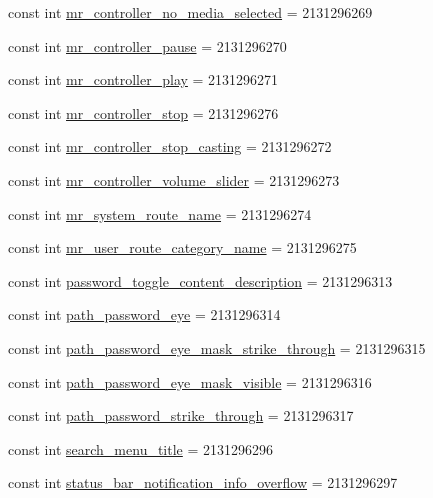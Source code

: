 \begin{CompactItemize}
const int \hyperlink{class__2doo_1_1_droid_1_1_resource_1_1_string_73c363fd9930688bf0b23ae01d21afdc}{mr\_\-controller\_\-no\_\-media\_\-selected} = 2131296269
\item 
const int \hyperlink{class__2doo_1_1_droid_1_1_resource_1_1_string_7c6f4d3d3ba11c49984c58cf8ef5545a}{mr\_\-controller\_\-pause} = 2131296270
\item 
const int \hyperlink{class__2doo_1_1_droid_1_1_resource_1_1_string_46e3efc97eef631ddcf532d02b52ae85}{mr\_\-controller\_\-play} = 2131296271
\item 
const int \hyperlink{class__2doo_1_1_droid_1_1_resource_1_1_string_618027e879ba7b226e9b915df0961188}{mr\_\-controller\_\-stop} = 2131296276
\item 
const int \hyperlink{class__2doo_1_1_droid_1_1_resource_1_1_string_7fd2c48559870d0e0628b8054904ca2c}{mr\_\-controller\_\-stop\_\-casting} = 2131296272
\item 
const int \hyperlink{class__2doo_1_1_droid_1_1_resource_1_1_string_f08fc0ec64fe7cf8e80f3c2154d0a3c5}{mr\_\-controller\_\-volume\_\-slider} = 2131296273
\item 
const int \hyperlink{class__2doo_1_1_droid_1_1_resource_1_1_string_55bed14c193bf99f283608a5c41e6885}{mr\_\-system\_\-route\_\-name} = 2131296274
\item 
const int \hyperlink{class__2doo_1_1_droid_1_1_resource_1_1_string_d1e05d552d36d8e4c5ace1b7d918b59e}{mr\_\-user\_\-route\_\-category\_\-name} = 2131296275
\item 
const int \hyperlink{class__2doo_1_1_droid_1_1_resource_1_1_string_72269cac9c7d83020ec378b61ade8754}{password\_\-toggle\_\-content\_\-description} = 2131296313
\item 
const int \hyperlink{class__2doo_1_1_droid_1_1_resource_1_1_string_431d818b3c3fb914b6c9ec960a616eb8}{path\_\-password\_\-eye} = 2131296314
\item 
const int \hyperlink{class__2doo_1_1_droid_1_1_resource_1_1_string_cb4cb06d1a1d1b6c50bb2373e89bcbec}{path\_\-password\_\-eye\_\-mask\_\-strike\_\-through} = 2131296315
\item 
const int \hyperlink{class__2doo_1_1_droid_1_1_resource_1_1_string_4e2ec147ec271b6de2d14a5617e5ada9}{path\_\-password\_\-eye\_\-mask\_\-visible} = 2131296316
\item 
const int \hyperlink{class__2doo_1_1_droid_1_1_resource_1_1_string_043836fcea7d779ac6fbb6759c946bbe}{path\_\-password\_\-strike\_\-through} = 2131296317
\item 
const int \hyperlink{class__2doo_1_1_droid_1_1_resource_1_1_string_a3693430f10928c6365aa825d431bf4e}{search\_\-menu\_\-title} = 2131296296
\item 
const int \hyperlink{class__2doo_1_1_droid_1_1_resource_1_1_string_96da752ee14cfe4d786c63f55adba81b}{status\_\-bar\_\-notification\_\-info\_\-overflow} = 2131296297
\end{CompactItemize}

